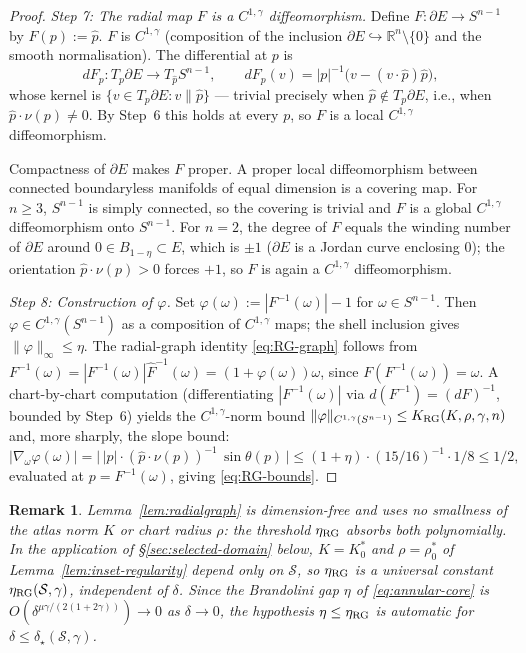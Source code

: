 \documentclass[11pt]{amsart}
\newtheorem{remark}[theorem]{Remark}
\newcommand{\R}{\mathbb R}
\newcommand{\Sclass}{\mathcal S}
\begin{document}
\begin{proof}
\emph{Step 7: The radial map $F$ is a $C^{1,\gamma}$
diffeomorphism.}  Define \(F:\partial E\to S^{n-1}\) by
\(F(p):=\widehat p\).  \(F\) is \(C^{1,\gamma}\) (composition of the
inclusion \(\partial E\hookrightarrow\R^n\setminus\{0\}\) and the
smooth normalisation).  The differential at \(p\) is
\[
   dF_p:T_p\partial E\to T_{\widehat p}S^{n-1},
   \qquad
   dF_p(v)=|p|^{-1}\bigl(v-(v\cdot\widehat p)\widehat p\bigr),
\]
whose kernel is \(\{v\in T_p\partial E:v\parallel\widehat p\}\) —
trivial precisely when \(\widehat p\notin T_p\partial E\), i.e., when
\(\widehat p\cdot\nu(p)\ne 0\).  By Step~6 this holds at every
\(p\), so \(F\) is a local \(C^{1,\gamma}\) diffeomorphism.

Compactness of \(\partial E\) makes \(F\) proper.  A proper local
diffeomorphism between connected boundaryless manifolds of equal
dimension is a covering map.  For \(n\ge 3\), \(S^{n-1}\) is simply
connected, so the covering is trivial and \(F\) is a global
\(C^{1,\gamma}\) diffeomorphism onto \(S^{n-1}\).  For \(n=2\), the
degree of \(F\) equals the winding number of \(\partial E\) around
\(0\in B_{1-\eta}\subset E\), which is \(\pm 1\) (\(\partial E\) is
a Jordan curve enclosing \(0\)); the orientation
\(\widehat p\cdot\nu(p)>0\) forces \(+1\), so \(F\) is again a
\(C^{1,\gamma}\) diffeomorphism.

\emph{Step 8: Construction of $\varphi$.}
Set \(\varphi(\omega):=|F^{-1}(\omega)|-1\) for \(\omega\in S^{n-1}\).
Then \(\varphi\in C^{1,\gamma}(S^{n-1})\) as a composition of
\(C^{1,\gamma}\) maps; the shell inclusion gives
\(\|\varphi\|_\infty\le\eta\).  The radial-graph identity
\eqref{eq:RG-graph} follows from \(F^{-1}(\omega)=|F^{-1}(\omega)|
\widehat F^{-1}(\omega)=(1+\varphi(\omega))\omega\), since \(F(F^{-1}
(\omega))=\omega\).  A chart-by-chart computation (differentiating
\(|F^{-1}(\omega)|\) via \(d(F^{-1})=(dF)^{-1}\), bounded by
Step~6) yields the \(C^{1,\gamma}\)-norm bound
\(\|\varphi\|_{C^{1,\gamma}(S^{n-1})}\le K_{\rm RG}(K,\rho,\gamma,n)\)
and, more sharply, the slope bound:
\[
   |\nabla_\omega\varphi(\omega)|
      =\bigl|\,|p|\cdot(\widehat p\cdot\nu(p))^{-1}\,\sin\theta(p)
      \,\bigr|
      \le(1+\eta)\cdot(15/16)^{-1}\cdot 1/8\le 1/2,
\]
evaluated at \(p=F^{-1}(\omega)\), giving \eqref{eq:RG-bounds}.
\end{proof}

\begin{remark}\label{rem:RG-dimfree}
Lemma~\ref{lem:radialgraph} is dimension-free and uses no smallness
of the atlas norm \(K\) or chart radius \(\rho\): the threshold
\(\eta_{\rm RG}\) absorbs both polynomially.  In the application of
\S\ref{sec:selected-domain} below, \(K=K_0^\ast\) and
\(\rho=\rho_0^\ast\) of Lemma~\ref{lem:inset-regularity} depend only
on \(\Sclass\), so \(\eta_{\rm RG}\) is a universal constant
\(\eta_{\rm RG}(\Sclass,\gamma)\), independent of \(\delta\).  Since
the Brandolini gap \(\eta\) of \eqref{eq:annular-core} is
\(O(\delta^{\mu\gamma/(2(1+2\gamma))})\to 0\) as \(\delta\to 0\), the
hypothesis \(\eta\le\eta_{\rm RG}\) is automatic for
\(\delta\le\delta_\star(\Sclass,\gamma)\).
\end{remark}
\end{document}

